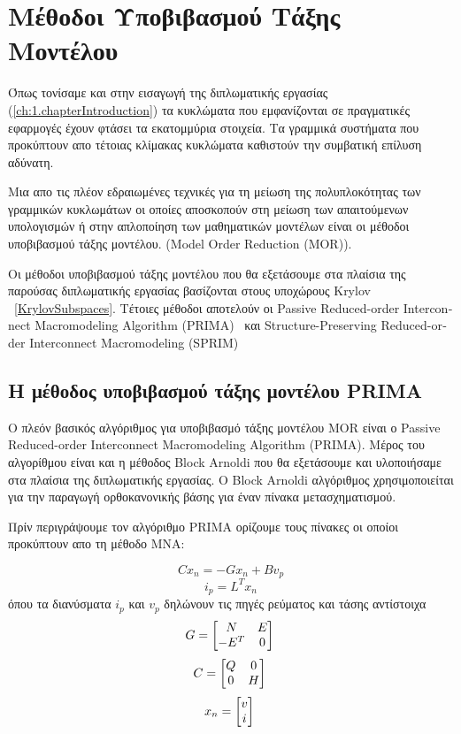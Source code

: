\chapter{Μέθοδοι Υποβιβασμού Τάξης Μοντέλου}
\label{ch:4.chapterMOR}

Όπως τονίσαμε και στην εισαγωγή της διπλωματικής εργασίας (\ref{ch:1.chapterIntroduction}) τα κυκλώματα που εμφανίζονται σε πραγματικές εφαρμογές έχουν φτάσει τα εκατομμύρια στοιχεία. Τα γραμμικά συστήματα που προκύπτουν απο τέτοιας κλίμακας κυκλώματα καθιστούν την συμβατική επίλυση αδύνατη.

Μια απο τις πλέον εδραιωμένες τεχνικές για τη μείωση της πολυπλοκότητας των γραμμικών κυκλωμάτων οι οποίες αποσκοπούν στη μείωση των απαιτούμενων υπολογισμών ή στην απλοποίηση των μαθηματικών μοντέλων είναι οι μέθοδοι υποβιβασμού τάξης μοντέλου. (\textlatin{Model Order Reduction (MOR)}).

Οι μέθοδοι υποβιβασμού τάξης μοντέλου που θα εξετάσουμε στα πλαίσια της παρούσας διπλωματικής εργασίας βασίζονται στους υποχώρους \textlatin{Krylov} ~\ref{KrylovSubspaces}. Τέτοιες μέθοδοι αποτελούν οι \textlatin{Passive Reduced-order Interconnect Macromodeling Algorithm (PRIMA)}~\cite{odabasioglu2003prima} και \textlatin{ Structure-Preserving Reduced-order Interconnect Macromodeling (SPRIM)} ~\cite{freund2004sprim}


\section{Η μέθοδος υποβιβασμού τάξης μοντέλου \textlatin{PRIMA}}

Ο πλεόν βασικός αλγόριθμος για υποβιβασμό τάξης μοντέλου \textlatin{MOR} είναι ο \textlatin{Passive Reduced-order Interconnect Macromodeling Algorithm (PRIMA)}. Μέρος του αλγορίθμου είναι και η μέθοδος \textlatin{Block Arnoldi} που θα εξετάσουμε και υλοποιήσαμε στα πλαίσια της διπλωματικής εργασίας. O \textlatin{Block Arnoldi} αλγόριθμος χρησιμοποιείται για την παραγωγή ορθοκανονικής βάσης για έναν πίνακα μετασχηματισμού.

Πρίν περιγράψουμε τον αλγόριθμο \textlatin{PRIMA} ορίζουμε τους πίνακες οι οποίοι προκύπτουν απο τη μέθοδο \textlatin{MNA}:

\begin{equation} \label{Cxn}
    C x_n = -G x_n + B v_p
\end{equation}
\[
    i_p = L^T x_n
\]
όπου τα διανύσματα $i_p$ και $v_p$ δηλώνουν τις πηγές ρεύματος και τάσης αντίστοιχα
\[
    G = 
    \begin{bmatrix}
    N & E \\
    -E^T & 0
    \end{bmatrix}\\
\]
\[
    C = 
    \begin{bmatrix}
    Q & 0 \\
    0 & H
    \end{bmatrix}\\
\]
\[
    x_n = 
    \begin{bmatrix}
    v \\
    i
    \end{bmatrix}\\
\]

